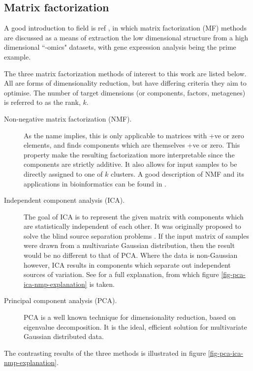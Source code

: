 \documentclass[draft, tikz, 12pt,a4paper,oneside,fleqn]{article}
\begin{document}
\subsection{Matrix factorization}
\label{sec-matrix-factorization-intro}

A good introduction to field is ref \cite{Stein-OBrien2018}, in which matrix factorization (MF) methods are discussed as a means of extraction the low dimensional structure from a high dimensional ``-omics" datasets, with gene expression analysis being the prime example.  

The three matrix factorization methods of interest to this work are listed below.  All are forms of dimensionality reduction, but have differing criteria they aim to optimise.  The number of target dimensions (or components, factors, metagenes) is referred to as the rank, $k$.
\begin{description}
\item [Non-negative matrix factorization (NMF).]  
As the name implies, this is only applicable to matrices with +ve or zero elements, and finds components which are themselves +ve or zero.   This property make the resulting factorization more interpretable since the components are strictly additive.   It also allows for input samples to be directly assigned to one of $k$ clusters.   A good description of NMF and its applications in bioinformatics can be found in \cite{Brunet2004}.
%
\item [Independent component analysis (ICA).] The goal of ICA is to represent the given matrix with components which are statistically independent of each other.  It was originally proposed to solve the blind source separation problems \cite{Comon1994}. If the input matrix of samples were drawn from a multivariate Gaussian distribution, then the result would be no different to that of PCA.    Where the data is non-Gaussian however, ICA results in components which separate out independent sources of variation.  See \cite{Sompairac2019} for a full explanation, from which figure \ref{fig-pca-ica-nmp-explanation} is taken.
\item [Principal component analysis (PCA).]  PCA is a well known technique for dimensionality reduction, based on eigenvalue decomposition.  It is the ideal, efficient solution for multivariate Gaussian distributed data.
\end{description}

The contrasting results of the three methods is illustrated in figure \ref{fig-pca-ica-nmp-explanation}.
\end{document}

